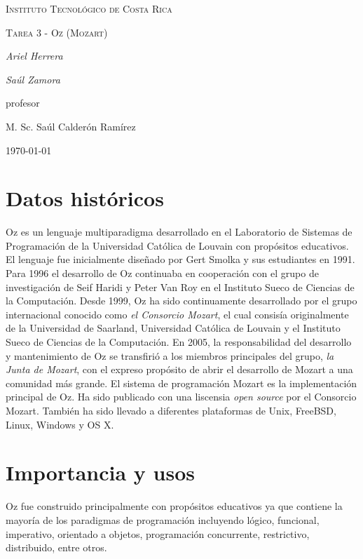 \documentclass{IEEEtran}
\begin{document}
\begin{titlepage}
  \centering
  {\scshape\LARGE Instituto Tecnol\'ogico de Costa Rica \par}
  \vspace{1cm}
  {\scshape\Large Tarea 3 - Oz (Mozart)\par}
  \vspace{1.5cm}
  {\Large\itshape Ariel Herrera\par}
  {\Large\itshape Sa\'ul Zamora\par}
  \vfill
  profesor\par
  M. Sc. Sa\'ul Calder\'on Ram\'irez \textsc{}

  \vfill

  {\large \today\par}
\end{titlepage}

\section{Datos hist\'oricos}
Oz es un lenguaje multiparadigma desarrollado en el Laboratorio de Sistemas de Programaci\'on de la Universidad Cat\'olica de Louvain con prop\'ositos educativos.
El lenguaje fue inicialmente dise\~nado por Gert Smolka y sus estudiantes en 1991. Para 1996 el desarrollo de Oz continuaba en cooperaci\'on con el grupo de investigaci\'on de Seif Haridi y Peter Van Roy en el Instituto Sueco de Ciencias de la Computaci\'on. Desde 1999, Oz ha sido continuamente desarrollado por el grupo internacional conocido como \emph{el Consorcio Mozart}, el cual consis\'ia originalmente de la Universidad de Saarland, Universidad Cat\'olica de Louvain y el Instituto Sueco de Ciencias de la Computaci\'on. En 2005, la responsabilidad del desarrollo y mantenimiento de Oz se transfiri\'o a los miembros principales del grupo, \emph{la Junta de Mozart}, con el expreso prop\'osito de abrir el desarrollo de Mozart a una comunidad m\'as grande.
El sistema de programaci\'on Mozart es la implementaci\'on principal de Oz. Ha sido publicado con una liscensia \emph{open source} por el Consorcio Mozart. Tambi\'en ha sido llevado a diferentes plataformas de Unix, FreeBSD, Linux, Windows y OS X.

\section{Importancia y usos}
Oz fue construido principalmente con prop\'ositos educativos ya que contiene la mayor\'ia de los paradigmas de programaci\'on incluyendo l\'ogico, funcional, imperativo, orientado a objetos, programaci\'on concurrente, restrictivo, distribuido, entre otros.
\end{document}
